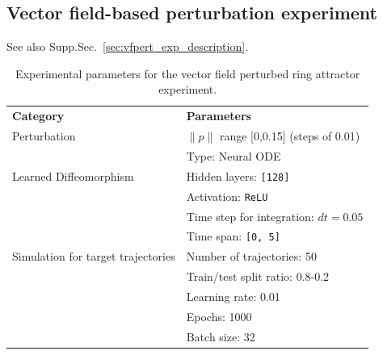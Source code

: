 \documentclass{article}
\theoremstyle{definition} \newtheorem{definition}{Definition}  \newtheorem{example}{Example}
\theoremstyle{remark} \newtheorem{remark}{Remark}
\newcounter{ct}
\begin{document}
\subsection{Vector field-based perturbation experiment}\label{sec:vfpert_exp_details}
See also Supp.Sec.~\ref{sec:vfpert_exp_description}.

\begin{table}[h]
\centering
\caption{Experimental parameters for the vector field perturbed ring attractor experiment.}
\label{tab:vfpert_params}
\begin{tabular}{p{5cm}p{6cm}}
\toprule
\textbf{Category} & \textbf{Parameters} \\
\multirow{1}{*}{Perturbation} 
    & $\|p\|$ range [0,0.15] (steps of 0.01) \\
\midrule
\multirow{3}{*}{Learned Diffeomorphism} 
    & Type: Neural ODE \\
    & Hidden layers: \texttt{[128]} \\
    & Activation: \texttt{ReLU} \\
\midrule
\multirow{5}{*}{Simulation for target trajectories} 
    & Time step for integration: $dt=0.05$ \\
    & Time span: \texttt{[0, 5]} \\
    & Number of trajectories: 50 \\
    & Train/test split ratio: 0.8-0.2 \\
\midrule
\multirow{3}{*}{Training} 
    & Learning rate:  0.01 \\
    & Epochs: 1000 \\
    & Batch size: 32 \\
\bottomrule
\end{tabular}
\end{table}
\end{document}
